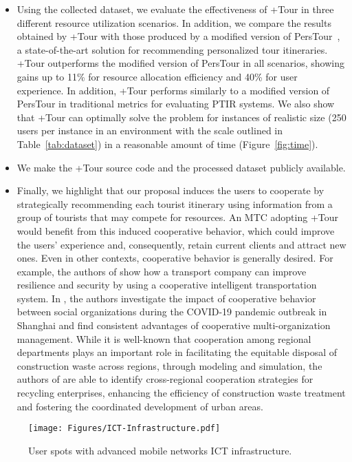 \begin{itemize}
\item Using the collected dataset, we evaluate the effectiveness of +Tour in three different resource utilization scenarios. In addition, we compare the results obtained by +Tour with those produced by a modified version of PersTour~\cite{lim-personalized:18}, a state-of-the-art solution for recommending personalized tour itineraries. +Tour outperforms the modified version of PersTour in all scenarios, showing gains up to 11\% for resource allocation efficiency and 40\% for user experience. In addition, +Tour performs similarly to {a modified version of} PersTour in traditional metrics for evaluating PTIR systems. We also show that +Tour can optimally solve the problem for instances of realistic size {(250 users per instance in an environment with the scale outlined in Table~\ref{tab:dataset})} in a reasonable amount of time {(Figure~\ref{fig:time})}.

\item We make the +Tour source code and the processed dataset publicly available.

\item {Finally, we highlight that our proposal induces the users to cooperate by strategically recommending each tourist itinerary using information from a group of tourists that may compete for resources. An MTC adopting +Tour would benefit from this induced cooperative behavior, which could improve the users’ experience and, consequently, retain current clients and attract new ones. Even in other contexts, cooperative behavior is generally desired. For example, the authors of \cite{rehman2022ITS} show how a transport company can improve resilience and security by using a cooperative intelligent transportation system. In \cite{fang2023COVID}, the authors investigate the impact of cooperative behavior between social organizations during the COVID-19 pandemic outbreak in Shanghai and find consistent advantages of cooperative multi-organization management. While it is well-known that cooperation among regional departments plays an important role in facilitating the equitable disposal of construction waste across regions, through modeling and simulation, the authors of \cite{mengdi2024recycling} are able to identify cross-regional cooperation strategies for recycling enterprises, enhancing the efficiency of construction waste treatment and fostering the coordinated development of urban areas.}

\end{itemize}

\begin{figure}[t]
    \centering
    \texttt{[image: Figures/ICT-Infrastructure.pdf]}
    \caption{User spots with {advanced mobile networks} ICT infrastructure.}
    \label{fig:ICT-Infrastructure}
\end{figure}

